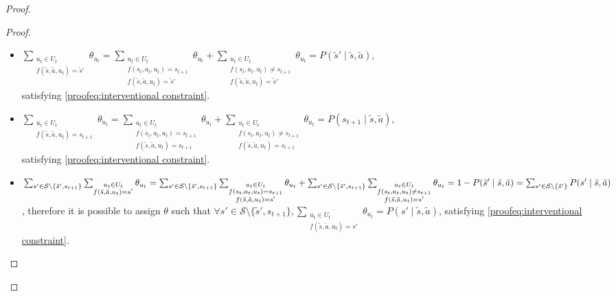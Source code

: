 \begin{proof}
\begin{proof}
\begin{itemize}
    \item $\sum_{\substack{u_t \in U_t \\f(\tilde{s}, \tilde{a}, u_t) = \tilde{s}'}} \theta_{u_t} = \sum_{\substack{u_t \in U_t \\f(s_t, a_t, u_t) = s_{t+1} \\ f(\tilde{s}, \tilde{a}, u_t) = \tilde{s}'}} \theta_{u_t} + \sum_{\substack{u_t \in U_t \\f(s_t, a_t, u_t) \neq s_{t+1} \\ f(\tilde{s}, \tilde{a}, u_t) = \tilde{s}'}} \theta_{u_t} = P(\tilde{s}' \mid \tilde{s}, \tilde{a})$, \\satisfying \eqref{proofeq:interventional constraint}.

    \item $\sum_{\substack{u_t \in U_t \\f(\tilde{s}, \tilde{a}, u_t) = s_{t+1}}} \theta_{u_t} = \sum_{\substack{u_t \in U_t \\f(s_t, a_t, u_t) = s_{t+1} \\ f(\tilde{s}, \tilde{a}, u_t) = s_{t+1}}} \theta_{u_t} + \sum_{\substack{u_t \in U_t \\f(s_t, a_t, u_t) \neq s_{t+1} \\ f(\tilde{s}, \tilde{a}, u_t) = s_{t+1}}} \theta_{u_t} = P(s_{t+1} \mid \tilde{s}, \tilde{a})$, \\satisfying \eqref{proofeq:interventional constraint}.
    
    \item $\sum_{s' \in \mathcal{S}\setminus\{\tilde{s}', s_{t+1}\}}\sum_{\substack{u_t \in U_t \\f(\tilde{s}, \tilde{a}, u_t) = s'}} \theta_{u_t} = \sum_{s' \in \mathcal{S}\setminus\{\tilde{s}', s_{t+1}\}}\sum_{\substack{u_t \in U_t \\f(s_t, a_t, u_t) = s_{t+1} \\ f(\tilde{s}, \tilde{a}, u_t) = s'}} \theta_{u_t} + \sum_{s' \in \mathcal{S}\setminus\{\tilde{s}', s_{t+1}\}}\sum_{\substack{u_t \in U_t \\f(s_t, a_t, u_t) \neq s_{t+1} \\ f(\tilde{s}, \tilde{a}, u_t) = s'}} \theta_{u_t} \\= 1 - P(\tilde{s}' \mid \tilde{s}, \tilde{a}) = \sum_{s' \in \mathcal{S}\setminus\{\tilde{s}'\}}P(s' \mid \tilde{s}, \tilde{a})$, therefore it is possible to assign $\theta$ such that $\forall s' \in \mathcal{S}\setminus\{\tilde{s}', s_{t+1}\}, \sum_{\substack{u_t \in U_t \\ f(\tilde{s}, \tilde{a}, u_t) = s'}}{\theta_{u_t}} = P(s' \mid \tilde{s}, \tilde{a})$, satisfying \eqref{proofeq:interventional constraint}.


\end{itemize}
\end{proof}
\end{proof}
